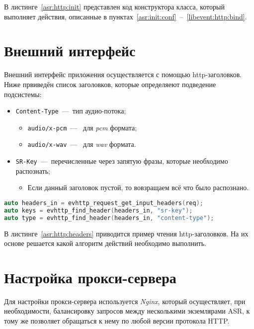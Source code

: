 В листинге~\ref{asr:http:init} представлен код конструктора класса, который
выполняет действия, описанные в пунктах~\ref{asr:init:conf}~--~\ref{libevent:http:bind}.

\section{Внешний интерфейс}

Внешний интерфейс приложения осуществляется с помощью http-заголовков. Ниже
првиведён список заголовков, которые определяеют подведение подсистемы:
\begin{itemize}
    \item \texttt{Content-Type}~---~тип аудио-потока;
    \begin{itemize}
        \item\texttt{audio/x-pcm}~---~ для \textit{pcm} формата;
        \item\texttt{audio/x-wav}~---~ для \textit{wav} формата.
    \end{itemize}
    \item \texttt{SR-Key}~---~перечисленные через запятую фразы, которые необходимо распознать;
    \begin{itemize}
        \item Если данный заголовок пустой, то вовзращаем всё что было распознано.
    \end{itemize}
\end{itemize}

\begin{lstlisting}[caption={Чтение заголовков},label={asr:http:headers},language=C++]
auto headers_in = evhttp_request_get_input_headers(req);
auto keys = evhttp_find_header(headers_in, "sr-key");
auto type = evhttp_find_header(headers_in, "content-type");

\end{lstlisting}

В листинге~\ref{asr:http:headers} приводится пример чтения http-заголовков. На их
основе решается какой алгоритм действий необходимо выполнить.

\section{Настройка прокси-сервера}

Для настройки прокси-сервера используется \textit{Nginx}, который осуществляет,
при необходимости, балансировку запросов между несколькими экземлярами ASR, к
тому же позволяет обращаться к нему по любой версии протокола HTTP.


